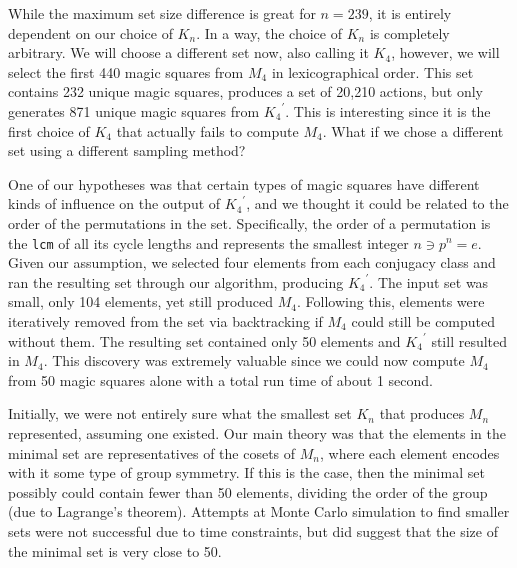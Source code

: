 \documentclass[12pt]{report}
\begin{document}
\par While the maximum set size difference is great for $n=239$, it is entirely dependent on our
choice of $K_n$. In a way, the choice of $K_n$ is completely arbitrary. We will choose a different
set now, also calling it $K_4$, however, we will select the first 440 magic squares from $M_4$ in
lexicographical order. This set contains 232 unique magic squares, produces a set of 20,210
actions, but only generates 871 unique magic squares from ${K_4}^\prime$. This is interesting since
it
is the first choice of $K_4$ that actually fails to compute $M_4$. What if we chose a different set
using a different sampling method?

\par One of our hypotheses was that certain types of magic squares have different kinds of
influence on the output of ${K_4}^\prime$, and we thought it could be related to the order of the
permutations in the set. Specifically, the order of a permutation is the \texttt{lcm} of all its
cycle lengths and represents the smallest integer $n \ni p^n = e$. Given our assumption, we
selected four elements from each conjugacy class and ran the resulting set through our algorithm,
producing ${K_4}^\prime$. The input set was small, only 104 elements, yet still produced $M_4$.
Following this, elements were iteratively removed from the set via backtracking if $M_4$ could
still be computed without them. The resulting set contained only 50 elements and ${K_4}^\prime$
still resulted in $M_4$. This discovery was extremely valuable since we could now compute $M_4$
from 50 magic squares alone with a total run time of about 1 second.

\par Initially, we were not entirely sure what the smallest set $K_n$ that produces $M_n$
represented, assuming one existed. Our main theory was that the elements in the minimal set are
representatives of the cosets of $M_n$, where each element encodes with it some type of group
symmetry. If this is the case, then the minimal set possibly could contain fewer than 50 elements,
dividing the order of the group (due to Lagrange's theorem). Attempts at Monte Carlo simulation to
find smaller sets were not successful due to time constraints, but did suggest that the size of the
minimal set is very close to 50.
\end{document}
